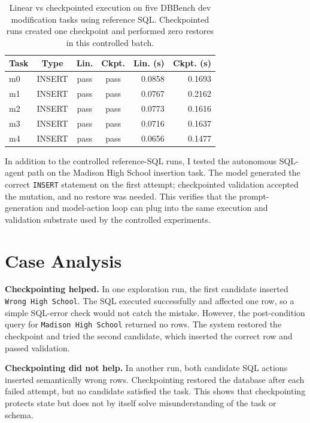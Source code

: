 \documentclass[10pt,twocolumn]{article}
\begin{document}
\begin{table}[H]
\centering
\scriptsize
\setlength{\tabcolsep}{2.8pt}
\begin{tabular}{lcccrr}
\toprule
Task & Type & Lin. & Ckpt. & Lin. (s) & Ckpt. (s) \\
\midrule
m0 & INSERT & pass & pass & 0.0858 & 0.1693 \\
m1 & INSERT & pass & pass & 0.0767 & 0.2162 \\
m2 & INSERT & pass & pass & 0.0773 & 0.1616 \\
m3 & INSERT & pass & pass & 0.0716 & 0.1637 \\
m4 & INSERT & pass & pass & 0.0656 & 0.1477 \\
\bottomrule
\end{tabular}
\caption{Linear vs checkpointed execution on five DBBench dev modification tasks using reference SQL. Checkpointed runs created one checkpoint and performed zero restores in this controlled batch.}
\label{tab:batch}
\end{table}

In addition to the controlled reference-SQL runs, I tested the autonomous SQL-agent path on the Madison High School insertion task. The model generated the correct \texttt{INSERT} statement on the first attempt; checkpointed validation accepted the mutation, and no restore was needed. This verifies that the prompt-generation and model-action loop can plug into the same execution and validation substrate used by the controlled experiments.

\section{Case Analysis}

\textbf{Checkpointing helped.} In one exploration run, the first candidate inserted \texttt{Wrong High School}. The SQL executed successfully and affected one row, so a simple SQL-error check would not catch the mistake. However, the post-condition query for \texttt{Madison High School} returned no rows. The system restored the checkpoint and tried the second candidate, which inserted the correct row and passed validation.

\textbf{Checkpointing did not help.} In another run, both candidate SQL actions inserted semantically wrong rows. Checkpointing restored the database after each failed attempt, but no candidate satisfied the task. This shows that checkpointing protects state but does not by itself solve misunderstanding of the task or schema.
\end{document}
